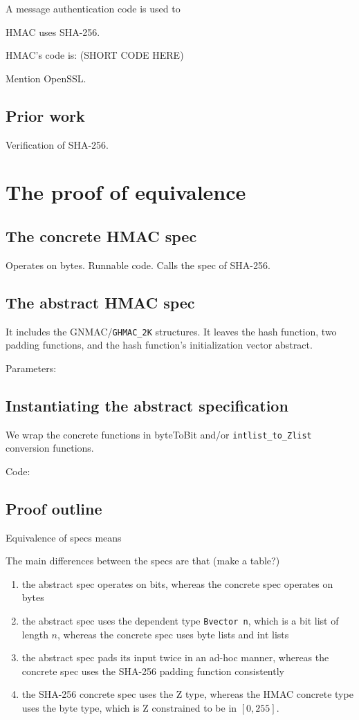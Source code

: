 \documentclass[twocolumn,showpacs,%
  nofootinbib,aps,superscriptaddress,%
  eqsecnum,prd,notitlepage,showkeys,10pt]{revtex4-1}
\begin{document}
A message authentication code is used to

HMAC uses SHA-256. 

HMAC's code is: (SHORT CODE HERE)

Mention OpenSSL.

\subsection{Prior work}

Verification of SHA-256.

\section{The proof of equivalence}

\subsection{The concrete HMAC spec}

Operates on bytes. Runnable code. Calls the spec of SHA-256.

\subsection{The abstract HMAC spec}

It includes the GNMAC/\verb|GHMAC_2K| structures. It leaves the hash function, two padding functions, and the hash function's initialization vector abstract.

Parameters:

\subsection{Instantiating the abstract specification}

We wrap the concrete functions in byteToBit and/or \verb|intlist_to_Zlist| conversion functions. 

Code:

\subsection{Proof outline}

Equivalence of specs means 

The main differences between the specs are that (make a table?)
\begin{enumerate} 
\item the abstract spec operates on bits, whereas the concrete spec operates on bytes
\item the abstract spec uses the dependent type \verb|Bvector n|, which is a bit list of length $n$, whereas the concrete spec uses byte lists and int lists
\item the abstract spec pads its input twice in an ad-hoc manner, whereas the concrete spec uses the SHA-256 padding function consistently
\item the SHA-256 concrete spec uses the Z type, whereas the HMAC concrete type uses the byte type, which is Z constrained to be in $[0, 255]$.
\end{enumerate}
\end{document}
